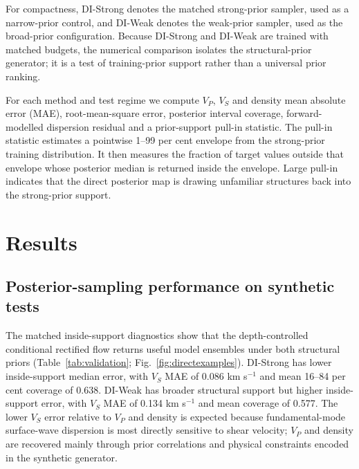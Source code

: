 \documentclass[referee]{gji}
\begin{document}
For compactness, DI-Strong denotes the matched strong-prior sampler, used as a narrow-prior control, and DI-Weak denotes the weak-prior sampler, used as the broad-prior configuration. Because DI-Strong and DI-Weak are trained with matched budgets, the numerical comparison isolates the structural-prior generator; it is a test of training-prior support rather than a universal prior ranking.

For each method and test regime we compute $V_P$, $V_S$ and density mean absolute error (MAE), root-mean-square error, posterior interval coverage, forward-modelled dispersion residual and a prior-support pull-in statistic. The pull-in statistic estimates a pointwise 1--99 per cent envelope from the strong-prior training distribution. It then measures the fraction of target values outside that envelope whose posterior median is returned inside the envelope. Large pull-in indicates that the direct posterior map is drawing unfamiliar structures back into the strong-prior support.

\section{Results}

\subsection{Posterior-sampling performance on synthetic tests}

The matched inside-support diagnostics show that the depth-controlled conditional rectified flow returns useful model ensembles under both structural priors (Table~\ref{tab:validation}; Fig.~\ref{fig:directexamples}). DI-Strong has lower inside-support median error, with $V_S$ MAE of 0.086 km s$^{-1}$ and mean 16--84 per cent coverage of 0.638. DI-Weak has broader structural support but higher inside-support error, with $V_S$ MAE of 0.134 km s$^{-1}$ and mean coverage of 0.577. The lower $V_S$ error relative to $V_P$ and density is expected because fundamental-mode surface-wave dispersion is most directly sensitive to shear velocity; $V_P$ and density are recovered mainly through prior correlations and physical constraints encoded in the synthetic generator.
\end{document}
